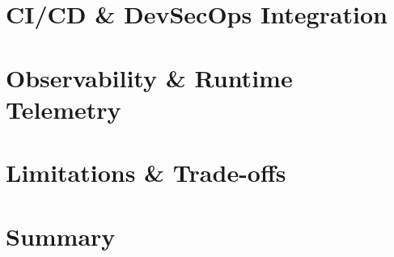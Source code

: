 \section{CI/CD & DevSecOps Integration}

\section{Observability & Runtime Telemetry}

\section{Limitations & Trade-offs}

\section{Summary}
